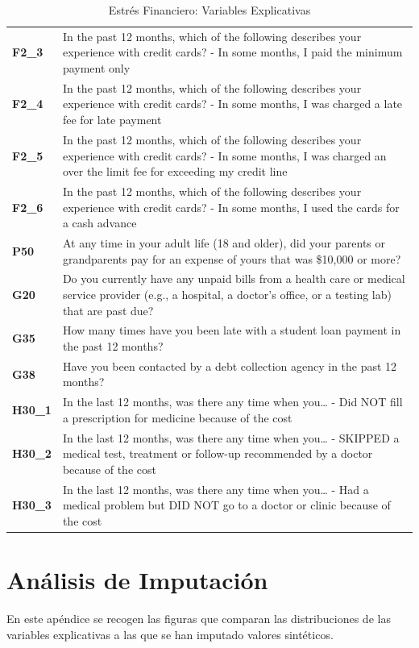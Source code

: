 \documentclass[a4paper, 11pt]{article}
\begin{document}
\begin{table}
\begin{tabular}{>{\RaggedRight\hspace{0pt}}m{1.5cm} >{\RaggedRight\hspace{0pt}}m{11cm}}
\textbf{F2\_3} & In the past 12 months, which of the following describes your experience with credit cards? - In some months, I paid the minimum payment only \\
\textbf{F2\_4} & In the past 12 months, which of the following describes your experience with credit cards? - In some months, I was charged a late fee for late payment  \\
\textbf{F2\_5} & In the past 12 months, which of the following describes your experience with credit cards? - In some months, I was charged an over the limit fee for exceeding my credit line  \\
\textbf{F2\_6} & In the past 12 months, which of the following describes your experience with credit cards? - In some months, I used the cards for a cash advance  \\
\textbf{P50} & At any time in your adult life (18 and older), did your parents or grandparents pay for an expense of yours that was \$10,000 or more?  \\
\textbf{G20} & Do you currently have any unpaid bills from a health care or medical service provider (e.g., a hospital, a doctor's office, or a testing lab) that are past due?  \\
\textbf{G35} & How many times have you been late with a student loan payment in the past 12 months? \\
\textbf{G38} & Have you been contacted by a debt collection agency in the past 12 months? \\
\textbf{H30\_1} & In the last 12 months, was there any time when you… - Did NOT fill a prescription for medicine because of the cost  \\
\textbf{H30\_2} & In the last 12 months, was there any time when you… - SKIPPED a medical test, treatment or follow-up recommended by a doctor because of the cost  \\
\textbf{H30\_3} & In the last 12 months, was there any time when you… - Had a medical problem but DID NOT go to a doctor or clinic because of the cost  \\
\bottomrule
\end{tabular}
\caption{Estrés Financiero: Variables Explicativas}
\label{table:stress_features}
\end{table}

\clearpage

\section{Análisis de Imputación}
\label{sec:synthetic_analysis}
En este apéndice se recogen las figuras que comparan las distribuciones de las 
variables explicativas a las que se han imputado valores sintéticos.
\end{document}
